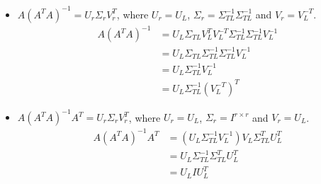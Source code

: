 \documentclass[11pt,a4paper]{article}
\begin{document}
\begin{itemize}
    \item $A(A^TA)^{-1} = U_r \Sigma_r V_r^T$, where 
        $U_r = U_L$, $\Sigma_r = \Sigma_{TL}^{-1}\Sigma_{TL}^{-1}$ and $V_r = V_L^{-T}$.
\begin{align}
    A (A^TA)^{-1}  
    &= U_L \Sigma_{TL} V_L^T V_L^{-T} \Sigma_{TL}^{-1} \Sigma_{TL}^{-1} V_L^{-1}   \\
    &= U_L \Sigma_{TL} \Sigma_{TL}^{-1} \Sigma_{TL}^{-1} V_L^{-1}   \\
    &= U_L \Sigma_{TL}^{-1} V_L^{-1} \\
    &= U_L \Sigma_{TL}^{-1} (V_L^{-T})^{T}
\end{align}

    \item $A(A^TA)^{-1} A^T = U_r \Sigma_r V_r^T$, where 
        $U_r = U_L$, $\Sigma_r = I^{r\times r}$ and $V_r = U_L$.
\begin{align}
    A (A^TA)^{-1} A^T
    &= (U_L \Sigma_{TL}^{-1} V_L^{-1}) V_L \Sigma_{TL}^T U_L^T \\
    &= U_L \Sigma_{TL}^{-1} \Sigma_{TL}^T U_L^T \\
    &= U_L I U_L^T
\end{align}
\end{itemize}


\newpage
\section{}
\newcommand{\bu}{\mathbf{u}}
\newcommand{\cchi}{\check{\chi}}
\end{document}
